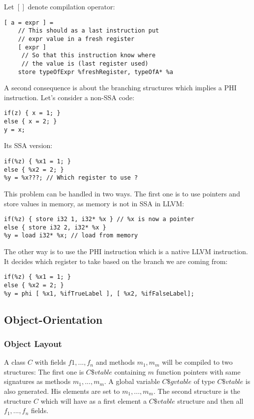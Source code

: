 Let $[ ]$ denote compilation operator:
\begin{lstlisting}
[ a = expr ] = 
    // This should as a last instruction put
    // expr value in a fresh register
    [ expr ]
     // So that this instruction know where
     // the value is (last register used)
    store typeOfExpr %freshRegister, typeOfA* %a
\end{lstlisting}

A second consequence is about the branching structures which implies a PHI instruction. Let's consider a non-SSA code:
\begin{lstlisting}
if(z) { x = 1; } 
else { x = 2; }
y = x;
\end{lstlisting}

Its SSA version:
\begin{lstlisting}
if(%z) { %x1 = 1; } 
else { %x2 = 2; }
%y = %x???; // Which register to use ?
\end{lstlisting}

This problem can be handled in two ways. The first one is to use pointers and store values in memory, as memory is not in SSA in LLVM:
\begin{lstlisting}
if(%z) { store i32 1, i32* %x } // %x is now a pointer
else { store i32 2, i32* %x }
%y = load i32* %x; // load from memory
\end{lstlisting}

The other way is to use the PHI instruction which is a native LLVM instruction. It decides which register to take based on the branch we are coming from:
\begin{lstlisting}
if(%z) { %x1 = 1; } 
else { %x2 = 2; }
%y = phi [ %x1, %ifTrueLabel ], [ %x2, %ifFalseLabel];
\end{lstlisting}

\subsection{Object-Orientation}
\subsubsection{Object Layout}
A class $C$ with fields $f1, ..., f_n$ and methods $m_1, m_m$ will be compiled to two structures: The first one is $C\$vtable$ containing $m$ function pointers with same signatures as methods $m_1, ..., m_m$. A global variable $C\$gvtable$ of type $C\$vtable$ is also generated. His elements are set to $m_1, ..., m_m$. The second structure is the structure $C$ which will have as a first element a $C\$vtable$ structure and then all $f_1, ..., f_n$ fields.

